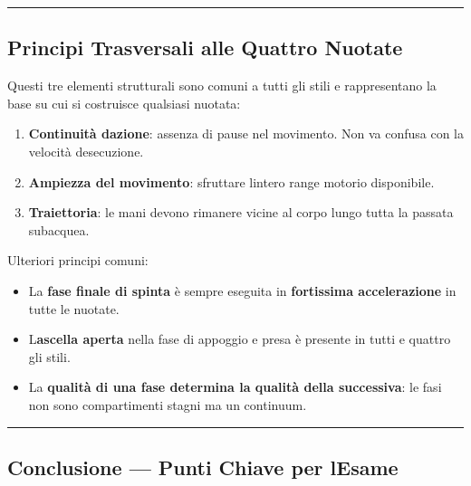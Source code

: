 \documentclass[a4paper,11pt]{article}
\providecommand{\tightlist}{%
  \setlength{\itemsep}{0pt}\setlength{\parskip}{0pt}}
\begin{document}
\begin{center}\rule{0.5\linewidth}{0.5pt}\end{center}

\subsection{Principi Trasversali alle Quattro
      Nuotate}\label{principi-trasversali-alle-quattro-nuotate}

Questi tre elementi strutturali sono comuni a tutti gli stili e
rappresentano la base su cui si costruisce qualsiasi nuotata:

\begin{enumerate}
      \tightlist
      \item
            \textbf{Continuità d\textquotesingle azione}: assenza di pause nel
            movimento. Non va confusa con la velocità
            d\textquotesingle esecuzione.
      \item
            \textbf{Ampiezza del movimento}: sfruttare l\textquotesingle intero
            range motorio disponibile.
      \item
            \textbf{Traiettoria}: le mani devono rimanere vicine al corpo lungo
            tutta la passata subacquea.
\end{enumerate}

Ulteriori principi comuni:

\begin{itemize}
      \tightlist
      \item
            La \textbf{fase finale di spinta} è sempre eseguita in
            \textbf{fortissima accelerazione} in tutte le nuotate.
      \item
            L\textquotesingle{}\textbf{ascella aperta} nella fase di appoggio e
            presa è presente in tutti e quattro gli stili.
      \item
            La \textbf{qualità di una fase determina la qualità della successiva}:
            le fasi non sono compartimenti stagni ma un continuum.
\end{itemize}

\begin{center}\rule{0.5\linewidth}{0.5pt}\end{center}

\subsection{Conclusione --- Punti Chiave per
      l\textquotesingle Esame}\label{conclusione-punti-chiave-per-lesame-8}
\end{document}
